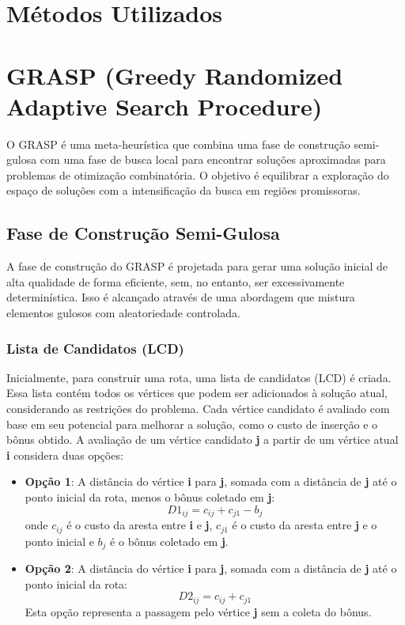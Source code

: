 \documentclass[12pt, a4paper]{report}
\begin{document}
\section{Métodos Utilizados}

\section*{GRASP (Greedy Randomized Adaptive Search Procedure)}
O GRASP é uma meta-heurística que combina uma fase de construção semi-gulosa com uma fase de busca local para encontrar soluções aproximadas para problemas de otimização combinatória. O objetivo é equilibrar a exploração do espaço de soluções com a intensificação da busca em regiões promissoras.

\subsection*{Fase de Construção Semi-Gulosa}

A fase de construção do GRASP é projetada para gerar uma solução inicial de alta qualidade de forma eficiente, sem, no entanto, ser excessivamente determinística.  Isso é alcançado através de uma abordagem que mistura elementos gulosos com aleatoriedade controlada.

\subsubsection*{Lista de Candidatos (LCD)}
Inicialmente, para construir uma rota, uma lista de candidatos (LCD) é criada. Essa lista contém todos os vértices que podem ser adicionados à solução atual, considerando as restrições do problema. Cada vértice candidato é avaliado com base em seu potencial para melhorar a solução, como o custo de inserção e o bônus obtido. A avaliação de um vértice candidato \textbf{j} a partir de um vértice atual \textbf{i} considera duas opções:
\begin{itemize}
    \item \textbf{Opção 1}: A distância do vértice \textbf{i} para \textbf{j}, somada com a distância de \textbf{j} até o ponto inicial da rota, menos o bônus coletado em \textbf{j}:
    $$ D1_{ij} = c_{ij} + c_{j1} - b_j $$
    onde $c_{ij}$ é o custo da aresta entre \textbf{i} e \textbf{j}, $c_{j1}$ é o custo da aresta entre \textbf{j} e o ponto inicial e $b_j$ é o bônus coletado em \textbf{j}.
    \item \textbf{Opção 2}: A distância do vértice \textbf{i} para \textbf{j}, somada com a distância de \textbf{j} até o ponto inicial da rota:
    $$ D2_{ij} = c_{ij} + c_{j1} $$
    Esta opção representa a passagem pelo vértice \textbf{j} sem a coleta do bônus.
\end{itemize}
\end{document}
